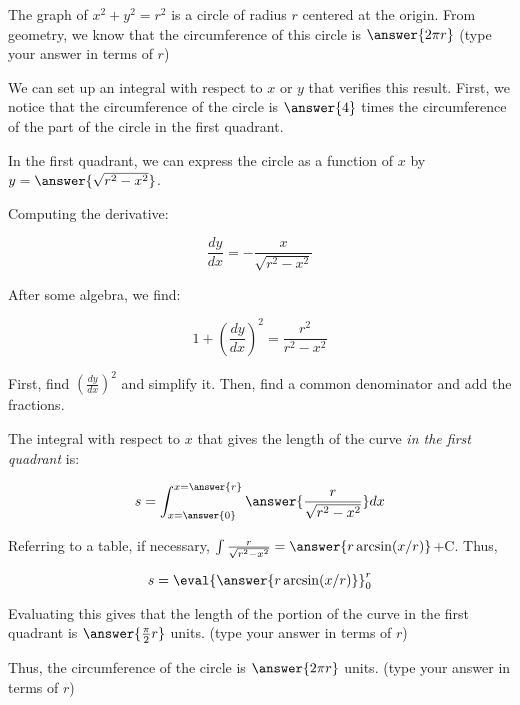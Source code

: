 \documentclass{ximera}
\author{Jim Talamo}
\begin{document}
\begin{exercise}

The graph of $x^2+y^2=r^2$ is a circle of radius $r$ centered at the origin.  From geometry, we know that the circumference of this circle is $\answer{2 \pi r}$ (type your answer in terms of $r$)

\begin{exercise}
We can set up an integral with respect to $x$ or $y$ that verifies this result.  First, we notice that the circumference of the circle is $\answer{4}$ times the circumference of the part of the circle in the first quadrant.

In the first quadrant, we can express the circle as a function of $x$ by $y=\answer{\sqrt{r^2-x^2}}$.

\begin{exercise}
Computing the derivative:

\[
\frac{dy}{dx} = -\frac{x}{\sqrt{r^2-x^2}}
\]

\begin{exercise}

After some algebra, we find:

\[
1+ \left(\frac{dy}{dx} \right)^2 = \frac{r^2}{r^2-x^2}
\]

\begin{hint}
First, find $\left(\frac{dy}{dx} \right)^2$ and simplify it.  Then, find a common denominator and add the fractions.
\end{hint}

\begin{exercise}

The integral with respect to $x$ that gives the length of the curve \emph{in the first quadrant} is:

\[
s= \int_{x=\answer{0}}^{x=\answer{r}} \answer{\frac{r}{\sqrt{r^2-x^2}}} dx
\]

\begin{exercise}
Referring to a table, if necessary, $\int \frac{r}{\sqrt{r^2-x^2}} = \answer{r \arcsin(x/r)}$+C.  Thus,

\[
s= \eval{\answer{r \arcsin(x/r)}}_0^r
\]

Evaluating this gives that the length of the portion of the curve in the first quadrant is $\answer{\frac{\pi}{2}r}$ units. (type your answer in terms of $r$)

\begin{exercise}
Thus, the circumference of the circle is $\answer{2 \pi r}$ units. (type your answer in terms of $r$)

\end{exercise}

\end{exercise}
\end{exercise}
\end{exercise}
\end{exercise}
\end{exercise}
\end{exercise}
\end{document}
